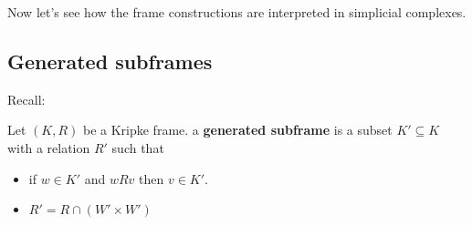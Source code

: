 Now let's see how the frame constructions are interpreted in simplicial complexes. 
\subsection{Generated subframes}

Recall:
\begin{definition}\hfill 

    Let $(K,R)$ be a Kripke frame. a \textbf{generated subframe} is a subset $K'\subseteq K$ with a relation $R'$ such that 
    \begin{itemize}
        \item if $w\in K'$ and $wRv$ then $v\in K'$.
        \item $R'=R\cap (W'\times W')$
    \end{itemize}
\end{definition}

